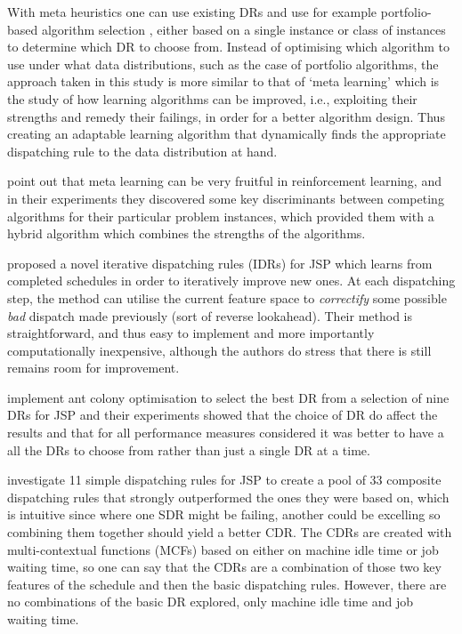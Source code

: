 \documentclass[smallextended]{svjour3}
\begin{document}
	With meta heuristics one can use existing DRs and use for example portfolio-based algorithm selection \citep{Rice76,Gomes01}, either based on a single instance or class of instances \citep{Xu07} to determine which DR to choose from. 
	Instead of optimising which algorithm to use under what data distributions, such as the case of portfolio algorithms, the approach taken in this study is more similar to that of `meta learning' \citep{Vilalta02} which is the study of how learning algorithms can be improved, i.e., exploiting their strengths and remedy their failings, in order for a better algorithm design. Thus creating an adaptable learning algorithm that dynamically finds the appropriate dispatching rule  to the data distribution at hand. 
	
	\citet{Kalyanakrishnan11} point out that meta learning can be very fruitful in reinforcement learning, and in their experiments they discovered some key discriminants between competing algorithms for their particular problem instances, which provided them with a hybrid algorithm which combines the strengths of the algorithms.
	
	\citet{Nguyen13} proposed a novel iterative dispatching rules (IDRs) for JSP which learns from completed schedules in order to iteratively improve new ones. At each dispatching step, the method can utilise the current feature space to \emph{correctify} some possible \emph{bad} dispatch made previously (sort of reverse lookahead).
	Their method is straightforward, and thus easy to implement and more importantly computationally inexpensive, although the authors do stress that there is still remains room for improvement. 
	
	\citet{Korytkowski13} implement ant colony optimisation to select the best DR from a selection of nine DRs for JSP and their experiments showed that the choice of DR do affect the results and that for all performance measures considered it was better to have a all the DRs to choose from rather than just a single DR at a time. 
	
	\citet{Lu13} investigate 11 simple dispatching rules for JSP to create a pool of 33 composite dispatching rules that strongly outperformed the ones they were based on, which is intuitive since where one SDR might be failing, another could be excelling so combining them together should yield a better CDR. The CDRs are created with multi-contextual functions (MCFs) based on either on machine idle time or job waiting time, so one can say that the CDRs are a combination of those two key features of the schedule and then the basic dispatching rules. However, there are no combinations of the basic DR explored, only machine idle time and job waiting time.  
	
\end{document}
